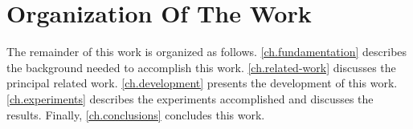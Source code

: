 \section{Organization Of The Work}
\label{sec.organization}
	
	The remainder of this work is organized as follows.
	\autoref{ch.fundamentation} describes the background needed to accomplish this work.
	\autoref{ch.related-work} discusses the principal related work.
	\autoref{ch.development} presents the development of this work.
	\autoref{ch.experiments} describes the experiments accomplished and discusses the results.
	Finally, \autoref{ch.conclusions} concludes this work.
